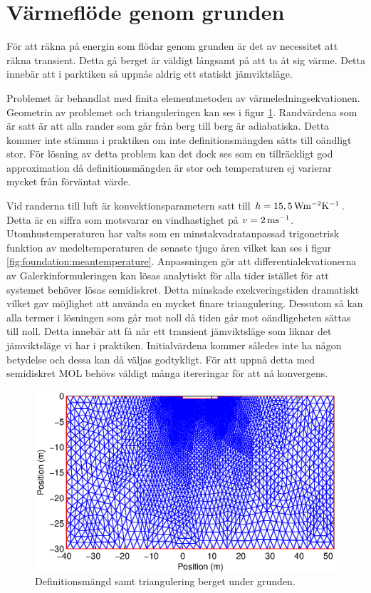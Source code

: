 \section{Värmeflöde genom grunden}

För att räkna på energin som flödar genom grunden är det av necessitet att räkna
transient. Detta gå berget är väldigt långsamt på att ta åt sig värme. Detta
innebär att i parktiken så uppnås aldrig ett statiskt jämviktsläge.

Problemet är behandlat med finita elementmetoden av värmeledningsekvationen.
Geometrin av problemet och trianguleringen kan ses i figur \ref{fig:foundation:tri}.
Randvärdena som är satt är att alla rander som går från berg till berg är adiabatiska.
Detta kommer inte stämma i praktiken om inte definitionsmängden sätts till oändligt
stor. För lösning av detta problem kan det dock ses som en tillräckligt god
approximation då definitionsmängden är stor och temperaturen ej varierar mycket
från förväntat värde.

Vid randerna till luft är konvektionsparametern satt
till $h = \unit[15,5]{Wm^{-2}K^{-1}}$. Detta är en siffra som motsvarar
en vindhastighet på $v = \unit[2]{ms^{-1}}$. Utomhustemperaturen har valts
som en minstakvadratanpassad trigonetrisk funktion av
medeltemperaturen de senaste tjugo åren vilket kan ses i figur
\ref{fig:foundation:meantemperature}. Anpassningen gör att
differentialekvationerna av Galerkinformuleringen kan lösas analytiskt
för alla tider istället för att systemet behöver lösas semidiskret.
Detta minskade exekveringstiden dramatiskt vilket gav möjlighet att använda en
mycket finare triangulering. Dessutom så kan alla termer i lösningen
som går mot noll då tiden går mot oändligeheten sättas till noll. Detta innebär
att få når ett transient jämviktsläge som liknar det jämviktsläge vi har i praktiken.
Initialvärdena kommer således inte ha någon betydelse och dessa kan då väljas
godtykligt. 
För att uppnå detta med semidiskret MOL behövs väldigt många itereringar för att
nå konvergens.

\begin{figure}
\centering
\includegraphics{images/trifoundation.eps}
\caption{Definitionsmängd samt triangulering berget under grunden.}
\label{fig:foundation:tri}
\end{figure}


